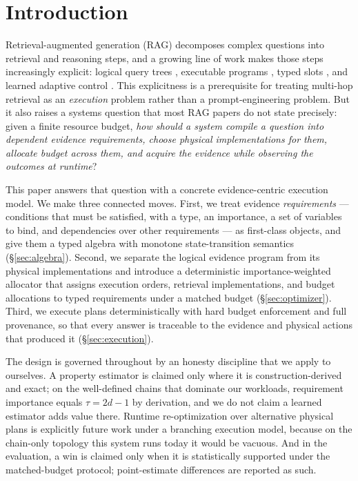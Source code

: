 \section{Introduction}
\label{sec:intro}

Retrieval-augmented generation (RAG) decomposes complex questions into
retrieval and reasoning steps, and a growing line of work makes those steps
increasingly explicit: logical query trees \cite{planrag}, executable programs
\cite{pyrag}, typed slots \cite{slotrag}, and learned adaptive control
\cite{dynakrag}. This explicitness is a prerequisite for treating multi-hop
retrieval as an \emph{execution} problem rather than a prompt-engineering
problem. But it also raises a systems question that most RAG papers do not
state precisely: given a finite resource budget, \emph{how should a system
compile a question into dependent evidence requirements, choose physical
implementations for them, allocate budget across them, and acquire the evidence
while observing the outcomes at runtime}?

This paper answers that question with a concrete evidence-centric execution
model. We make three connected moves. First, we treat evidence \emph{requirements}
--- conditions that must be satisfied, with a type, an importance, a set of
variables to bind, and dependencies over other requirements --- as first-class
objects, and give them a typed algebra with monotone state-transition
semantics (\S\ref{sec:algebra}). Second, we separate the logical evidence
program from its physical implementations and introduce a deterministic
importance-weighted allocator that assigns execution orders, retrieval
implementations, and budget allocations to typed requirements under a matched
budget (\S\ref{sec:optimizer}). Third, we execute plans deterministically with
hard budget enforcement and full provenance, so that every answer is traceable
to the evidence and physical actions that produced it (\S\ref{sec:execution}).

The design is governed throughout by an honesty discipline that we apply to
ourselves. A property estimator is claimed only where it is construction-derived
and exact; on the well-defined chains that dominate our workloads, requirement
importance equals $\tau = 2d-1$ by derivation, and we do not claim a learned
estimator adds value there. Runtime re-optimization over alternative physical
plans is explicitly future work under a branching execution model, because on
the chain-only topology this system runs today it would be vacuous. And in the
evaluation, a win is claimed only when it is statistically supported under the
matched-budget protocol; point-estimate differences are reported as such.

